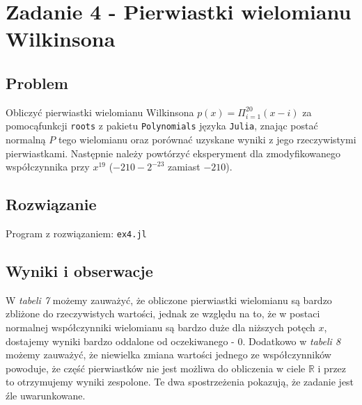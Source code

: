 \documentclass[12pt]{article}
\begin{document}
\newpage

\section*{Zadanie 4 - Pierwiastki wielomianu Wilkinsona}
    \subsection*{Problem}
        Obliczyć pierwiastki wielomianu Wilkinsona $p(x) = \Pi_{i=1}^{20} (x - i)$ za pomocąfunkcji \texttt{roots} z pakietu \texttt{Polynomials} języka \texttt{Julia}, znając postać normalną $P$ tego wielomianu oraz porównać uzyskane wyniki z jego rzeczywistymi pierwiastkami.
        \newline
        Następnie należy powtórzyć eksperyment dla zmodyfikowanego współczynnika przy $x^{19}$ ($-210 - 2^{-23}$ zamiast $-210$).

    \subsection*{Rozwiązanie}
        Program z rozwiązaniem: \texttt{ex4.jl}

    \subsection*{Wyniki i obserwacje}
        W \textit{tabeli 7} możemy zauważyć, że obliczone pierwiastki wielomianu są bardzo zbliżone do rzeczywistych wartości, jednak ze względu na to, że w postaci normalnej współczynniki wielomianu są bardzo duże dla niższych potęch $x$, dostajemy wyniki bardzo oddalone od oczekiwanego - $0$.
        \newline
        Dodatkowo w \textit{tabeli 8} możemy zauważyć, że niewielka zmiana wartości jednego ze współczynników powoduje, że część pierwiastków nie jest możliwa do obliczenia w ciele $\mathbb{R}$ i przez to otrzymujemy wyniki zespolone.
        \newline
        Te dwa spostrzeżenia pokazują, że zadanie jest źle uwarunkowane.
\end{document}
